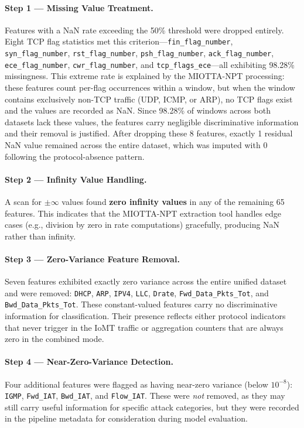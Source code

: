 \paragraph{Step 1 --- Missing Value Treatment.}
Features with a NaN rate exceeding the 50\% threshold were dropped entirely. Eight TCP flag statistics met this criterion---\texttt{fin\_flag\_number}, \texttt{syn\_flag\_number}, \texttt{rst\_flag\_number}, \texttt{psh\_flag\_number}, \texttt{ack\_flag\_number}, \texttt{ece\_flag\_number}, \texttt{cwr\_flag\_number}, and \texttt{tcp\_flags\_ece}---all exhibiting 98.28\% missingness. This extreme rate is explained by the MIOTTA-NPT processing: these features count per-flag occurrences within a window, but when the window contains exclusively non-TCP traffic (UDP, ICMP, or ARP), no TCP flags exist and the values are recorded as NaN. Since 98.28\% of windows across both datasets lack these values, the features carry negligible discriminative information and their removal is justified. After dropping these 8 features, exactly 1 residual NaN value remained across the entire dataset, which was imputed with 0 following the protocol-absence pattern.

\paragraph{Step 2 --- Infinity Value Handling.}
A scan for $\pm\infty$ values found \textbf{zero infinity values} in any of the remaining 65 features. This indicates that the MIOTTA-NPT extraction tool handles edge cases (e.g., division by zero in rate computations) gracefully, producing NaN rather than infinity.

\paragraph{Step 3 --- Zero-Variance Feature Removal.}
Seven features exhibited exactly zero variance across the entire unified dataset and were removed: \texttt{DHCP}, \texttt{ARP}, \texttt{IPV4}, \texttt{LLC}, \texttt{Drate}, \texttt{Fwd\_Data\_Pkts\_Tot}, and \texttt{Bwd\_Data\_Pkts\_Tot}. These constant-valued features carry no discriminative information for classification. Their presence reflects either protocol indicators that never trigger in the IoMT traffic or aggregation counters that are always zero in the combined mode.

\paragraph{Step 4 --- Near-Zero-Variance Detection.}
Four additional features were flagged as having near-zero variance (below $10^{-8}$): \texttt{IGMP}, \texttt{Fwd\_IAT}, \texttt{Bwd\_IAT}, and \texttt{Flow\_IAT}. These were \textit{not} removed, as they may still carry useful information for specific attack categories, but they were recorded in the pipeline metadata for consideration during model evaluation.

